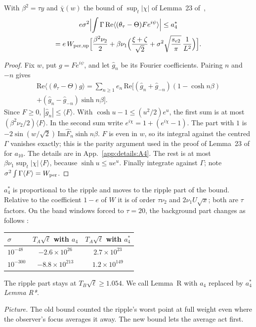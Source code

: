 \begin{lemma}[Lemma A4*] \proofst
\label{lem:A4}
With $\beta^2=\tau y$ and $\bar\chi(w)$ the bound of $\sup_t|\chi|$ of Lemma~23 of~\cite{F},
\begin{multline}
e\sigma^2\Bigl|\int\Gamma\,\mathrm{Re}\langle(\theta_\tau-\Theta)Fe^{i\psi}\rangle\Bigr|
\le a_4^*\\
=e\,W_{\rm per,up}\Bigl[\frac{\beta^2\nu_2}{2}
+\beta\nu_1\Bigl(\frac{\xi+\zeta}{\sqrt2}+\sigma^2\sqrt{\frac{s_{e2}}{\pi}}\,\frac{1}{L^2}\Bigr)\Bigr].
\end{multline}
\end{lemma}
\begin{proof}
Fix $w$, put $g=Fe^{i\psi}$, and let $\hat g_n$ be its Fourier coefficients.
Pairing $n$ and $-n$ gives
\begin{multline}
\mathrm{Re}\langle(\theta_\tau-\Theta)g\rangle
=\sum_{n\ge1}e_n\,\mathrm{Re}\bigl[(\hat g_n+\hat g_{-n})(1-\cosh n\beta)\\
+(\hat g_n-\hat g_{-n})\sinh n\beta\bigr].
\end{multline}
Since $F\ge0$, $|\hat g_n|\le\langle F\rangle$.
With $\cosh u-1\le(u^2/2)e^u$, the first sum is at most $(\beta^2\nu_2/2)\langle F\rangle$.
In the second sum write $e^{i\chi}=1+(e^{i\chi}-1)$.
The part with $1$ is $-2\sin(w/\sqrt2)\,\mathrm{Im}\hat F_n\sinh n\beta$.
$F$ is even in $w$, so its integral against the centred $\Gamma$ vanishes exactly; this is the parity argument used in the proof of Lemma~23 of~\cite{F} for $a_{10}$.
The details are in App.~\ref{app:details:A4}.
The rest is at most $\beta\nu_1\sup_t|\chi|\,\langle F\rangle$, because $\sinh u\le ue^u$.
Finally integrate against $\Gamma$; note $\sigma^2\int\Gamma\langle F\rangle=W_{\rm per}$.
\end{proof}
$a_4^*$ is proportional to the ripple and moves to the ripple part of the bound.
Relative to the coefficient $1-e$ of $W$ it is of order $\tau\nu_2$ and $2\nu_1U\sqrt x$; both are $\tau$ factors.
On the band windows forced to $\tau=20$, the background part changes as follows \numst:

\begin{center}
\small
\begin{tabular}{lcc}
$\sigma$ & $T_A\sqrt\ell$ with $a_4$ & $T_A\sqrt\ell$ with $a_4^*$\\ \hline
$10^{-48}$ & $-2.6\times10^{26}$ & $2.7\times10^{23}$\\
$10^{-300}$ & $-8.8\times10^{213}$ & $1.2\times10^{149}$\\
\end{tabular}
\end{center}

\noindent The ripple part stays at $T_B\sqrt\ell\ge1.054$.
We call Lemma~R with $a_4$ replaced by $a_4^*$ \emph{Lemma R*}.

\emph{Picture.} The old bound counted the ripple's worst point at full weight even where the observer's focus averages it away.
The new bound lets the average act first.

